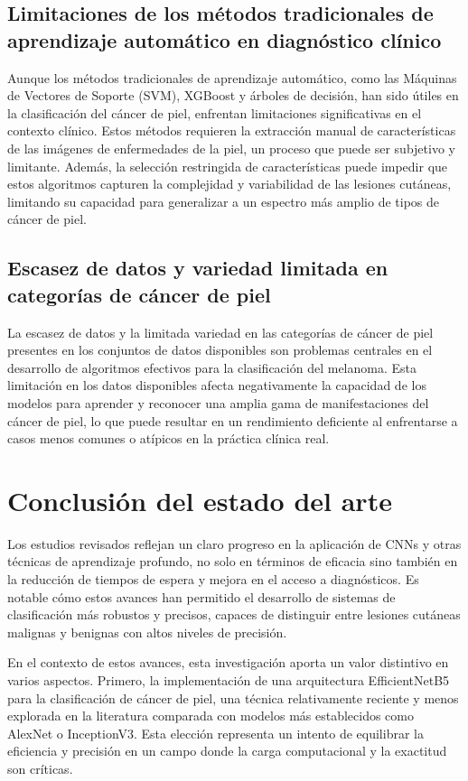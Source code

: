 \subsection{Limitaciones de los métodos tradicionales de aprendizaje automático en diagnóstico clínico}
Aunque los métodos tradicionales de aprendizaje automático, como las Máquinas de Vectores de Soporte (SVM), XGBoost y árboles de decisión, han sido útiles en la clasificación del cáncer de piel, enfrentan limitaciones significativas en el contexto clínico. Estos métodos requieren la extracción manual de características de las imágenes de enfermedades de la piel, un proceso que puede ser subjetivo y limitante. Además, la selección restringida de características puede impedir que estos algoritmos capturen la complejidad y variabilidad de las lesiones cutáneas, limitando su capacidad para generalizar a un espectro más amplio de tipos de cáncer de piel. 

\subsection{Escasez de datos y variedad limitada en categorías de cáncer de piel}
La escasez de datos y la limitada variedad en las categorías de cáncer de piel presentes en los conjuntos de datos disponibles son problemas centrales en el desarrollo de algoritmos efectivos para la clasificación del melanoma. Esta limitación en los datos disponibles afecta negativamente la capacidad de los modelos para aprender y reconocer una amplia gama de manifestaciones del cáncer de piel, lo que puede resultar en un rendimiento deficiente al enfrentarse a casos menos comunes o atípicos en la práctica clínica real. 

\section{Conclusión del estado del arte}

Los estudios revisados reflejan un claro progreso en la aplicación de CNNs y otras técnicas de aprendizaje profundo, no solo en términos de eficacia sino también en la reducción de tiempos de espera y mejora en el acceso a diagnósticos. Es notable cómo estos avances han permitido el desarrollo de sistemas de clasificación más robustos y precisos, capaces de distinguir entre lesiones cutáneas malignas y benignas con altos niveles de precisión.

En el contexto de estos avances, esta investigación aporta un valor distintivo en varios aspectos. Primero, la implementación de una arquitectura EfficientNetB5 para la clasificación de cáncer de piel, una técnica relativamente reciente y menos explorada en la literatura comparada con modelos más establecidos como AlexNet o InceptionV3. Esta elección representa un intento de equilibrar la eficiencia y precisión en un campo donde la carga computacional y la exactitud son críticas.

